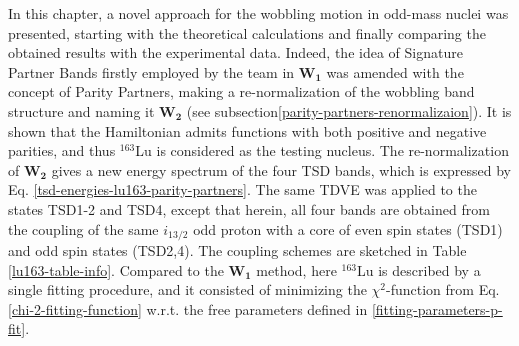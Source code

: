 In this chapter, a novel approach for the wobbling motion in odd-mass nuclei was presented, starting with the theoretical calculations and finally comparing the obtained results with the experimental data. Indeed, the idea of Signature Partner Bands firstly employed by the team in $\mathbf{W_1}$ was amended with the concept of Parity Partners, making a re-normalization of the wobbling band structure and naming it $\mathbf{W_2}$ (see subsection\ref{parity-partners-renormalizaion}). It is shown that the Hamiltonian admits functions with both positive and negative parities, and thus $^{163}$Lu is considered as the testing nucleus. The re-normalization of $\mathbf{W_2}$ gives a new energy spectrum of the four TSD bands, which is expressed by Eq. \ref{tsd-energies-lu163-parity-partners}. The same TDVE was applied to the states TSD1-2 and TSD4, except that herein, all four bands are obtained from the coupling of the same $i_{13/2}$ odd proton with a core of even spin states (TSD1) and odd spin states (TSD2,4). The coupling schemes are sketched in Table \ref{lu163-table-info}. Compared to the $\mathbf{W_1}$ method, here $^{163}$Lu is described by a single fitting procedure, and it consisted of minimizing the $\chi^2$-function from Eq. \ref{chi-2-fitting-function} w.r.t. the free parameters defined in \ref{fitting-parameters-p-fit}. 

